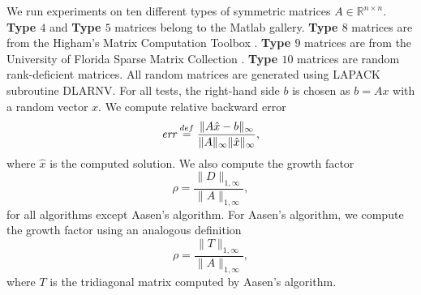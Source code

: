 \documentclass[11pt]{article}
\begin{document}
We run experiments on ten different types of symmetric matrices $A\in \mathbb{R}^{n\times n}$. {\bf Type $4$} and {\bf Type $5$} matrices belong to the Matlab gallery. {\bf Type $8$} matrices are from the Higham's Matrix Computation Toolbox \cite{higham2002matrix}. {\bf Type $9$} matrices are from the University of Florida Sparse Matrix Collection \cite{davis2011university}. {\bf Type $10$} matrices are random rank-deficient matrices. All random matrices are generated using LAPACK subroutine DLARNV. For all tests, the right-hand side $b$ is chosen as $b=Ax$ with a random vector $x$. We compute relative backward error
\begin{equation} \label{Eq:Formula for BE}
\emph{err} \stackrel{def}{=} \frac{\| A \hat{x} - b \|_\infty}{\| A \|_\infty \| \hat{x} \|_\infty},
\end{equation}
where $\hat{x} $ is the computed solution. We also compute the growth factor  
\begin{equation} \label{Eq:Formula for GF of LDL}
\rho = \frac{\|D\|_{1,\infty}}{\|A\|_{1,\infty}},
\end{equation}
for all algorithms except Aasen's algorithm. For Aasen's algorithm, we compute the growth factor using an analogous definition
\begin{equation} \label{Eq:Formula for GF of LTL}
\rho = \frac{\|T\|_{1,\infty}}{\|A\|_{1,\infty}},
\end{equation}
where $T$ is the tridiagonal matrix computed by Aasen's algorithm.
\end{document}

